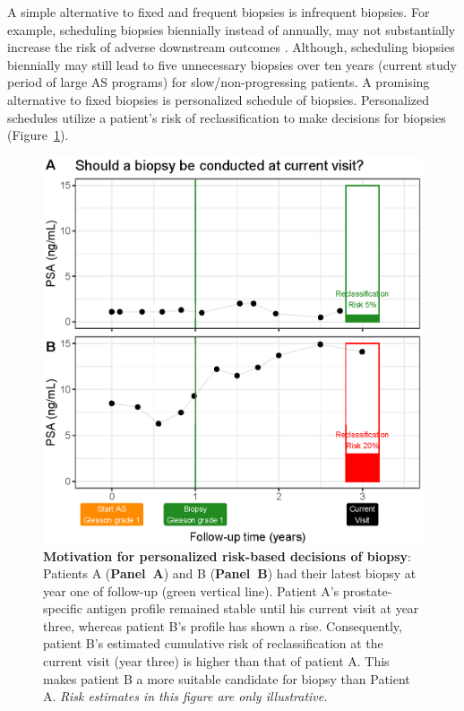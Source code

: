 A simple alternative to fixed and frequent biopsies is infrequent biopsies. For example, scheduling biopsies biennially instead of annually, may not substantially increase the risk of adverse downstream outcomes \citep{inoue2018comparative,de2017estimating}. Although, scheduling biopsies biennially may still lead to five unnecessary biopsies over ten years (current study period of large AS programs) for slow/non-progressing patients. A promising alternative to fixed biopsies is personalized schedule of biopsies. Personalized schedules utilize a patient's risk of reclassification to make decisions for biopsies (Figure~\ref{fig:riskBasedExample}).

\begin{figure}
\centerline{\includegraphics[width=\columnwidth]{images/riskBasedExample.eps}}
\caption{\textbf{Motivation for personalized risk-based decisions of biopsy}: Patients A (\textbf{Panel~A}) and B (\textbf{Panel~B}) had their latest biopsy at year one of follow-up (green vertical line). Patient A's prostate-specific antigen profile remained stable until his current visit at year three, whereas patient B's profile has shown a rise. Consequently, patient B's estimated cumulative risk of reclassification at the current visit (year three) is higher than that of patient A. This makes patient B a more suitable candidate for biopsy than Patient A. \textit{Risk estimates in this figure are only illustrative.}}
\label{fig:riskBasedExample}
\end{figure}

